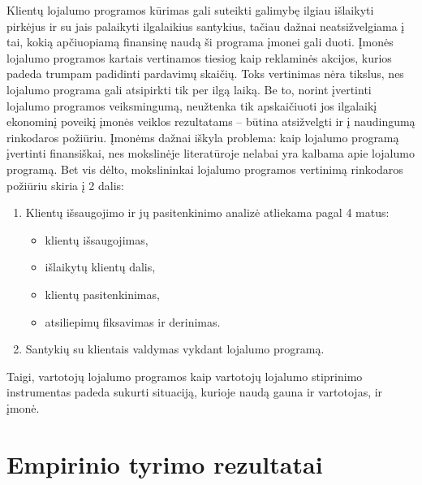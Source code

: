 \documentclass[12pt,titlepage]{article}
\begin{document}
Klientų lojalumo programos kūrimas gali suteikti galimybę ilgiau išlaikyti pirkėjus ir su jais palaikyti ilgalaikius santykius, tačiau dažnai neatsižvelgiama į tai, kokią apčiuopiamą finansinę naudą ši programa įmonei gali duoti. Įmonės lojalumo programos kartais vertinamos tiesiog kaip reklaminės akcijos, kurios padeda trumpam padidinti pardavimų skaičių. \parencite{vzigiene2006lojalumo} Toks vertinimas nėra tikslus, nes lojalumo programa gali atsipirkti tik per ilgą laiką. Be to, norint įvertinti lojalumo programos veiksmingumą, neužtenka tik apskaičiuoti jos ilgalaikį ekonominį poveikį įmonės veiklos rezultatams – būtina atsižvelgti ir į naudingumą rinkodaros požiūriu. Įmonėms dažnai iškyla problema: kaip lojalumo programą įvertinti finansiškai, nes mokslinėje literatūroje nelabai yra kalbama apie lojalumo programą. Bet vis dėlto, 
mokslininkai lojalumo programos vertinimą rinkodaros požiūriu skiria į 2 dalis:\\
\begin{enumerate}
\item Klientų išsaugojimo ir jų pasitenkinimo analizė atliekama pagal 4 matus:
\begin{itemize}
\item klientų išsaugojimas,
\item išlaikytų klientų dalis,
\item klientų pasitenkinimas,
\item atsiliepimų fiksavimas ir derinimas.
\end{itemize}
\item Santykių su klientais valdymas vykdant lojalumo programą. \parencite{vzigiene2006lojalumo}
\end{enumerate}

Taigi, vartotojų lojalumo programos kaip vartotojų lojalumo stiprinimo instrumentas padeda sukurti situaciją, kurioje naudą gauna ir vartotojas, ir įmonė.
\justify

\section{Empirinio tyrimo rezultatai}
\justify
\end{document}
